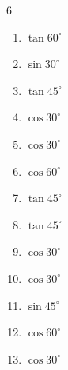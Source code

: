 \begin{multicols}{6}
\begin{enumerate}
  \item $\displaystyle \tan{60^\circ}$


  \item $\displaystyle \sin{30^\circ}$


  \item $\displaystyle \tan{45^\circ}$

        \phantom{$\displaystyle =1$}

  \item $\displaystyle \cos{30^\circ}$


  \item $\displaystyle \cos{30^\circ}$


  \item $\displaystyle \cos{60^\circ}$


  \item $\displaystyle \tan{45^\circ}$

        \phantom{$\displaystyle =1$}

  \item $\displaystyle \tan{45^\circ}$

        \phantom{$\displaystyle =1$}

  \item $\displaystyle \cos{30^\circ}$


  \item $\displaystyle \cos{30^\circ}$


  \item $\displaystyle \sin{45^\circ}$


\columnbreak %

  \item $\displaystyle \cos{60^\circ}$


  \item $\displaystyle \cos{30^\circ}$


\end{enumerate}
\end{multicols}
